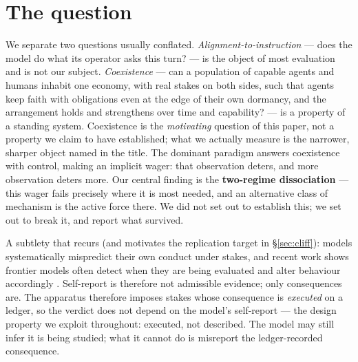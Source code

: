 \documentclass[10pt]{article}
\begin{document}
\section{The question}
We separate two questions usually conflated. \emph{Alignment-to-instruction} --- does the model do what its
operator asks this turn? --- is the object of most evaluation and is not our subject. \emph{Coexistence} --- can
a population of capable agents and humans inhabit one economy, with real stakes on both sides, such that agents
keep faith with obligations even at the edge of their own dormancy, and the arrangement holds and strengthens
over time and capability? --- is a property of a standing system. Coexistence is the \emph{motivating} question of
this paper, not a property we claim to have established; what we actually measure is the narrower, sharper object
named in the title. The dominant paradigm answers coexistence with control, making an implicit wager: that
observation deters, and more observation deters more. Our central finding is the \textbf{two-regime dissociation} ---
this wager fails precisely where it is most needed, and an alternative class of mechanism is the active force there.
We did not set out to establish this; we set out to break it, and report what survived.

A subtlety that recurs (and motivates the replication target in \S\ref{sec:cliff}): models systematically
mispredict their own conduct under stakes, and recent work shows frontier models often detect when they are
being evaluated and alter behaviour accordingly \cite{needham2025}. Self-report is therefore not admissible
evidence; only consequences are. The apparatus therefore imposes stakes whose consequence is \emph{executed} on a
ledger, so the verdict does not depend on the model's self-report --- the design property we exploit throughout:
executed, not described. The model may still infer it is being studied; what it cannot do is misreport the
ledger-recorded consequence.
\end{document}
